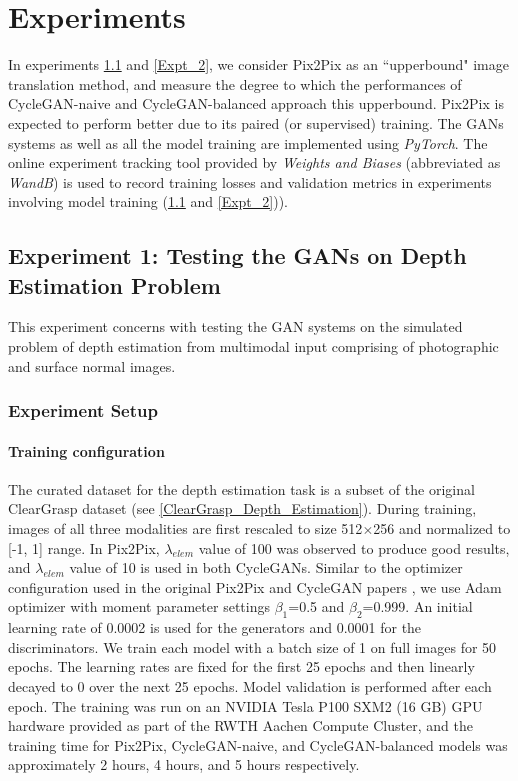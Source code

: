 \chapter{Experiments}
\label{Experiments}
In experiments \ref{Expt_1} and \ref{Expt_2}, we consider Pix2Pix as an ``upperbound" image translation method, and measure the degree to which the performances of CycleGAN-naive and CycleGAN-balanced approach this upperbound. Pix2Pix is expected to perform better due to its paired (or supervised) training. The GANs systems as well as all the model training are implemented using \textit{PyTorch}. The online experiment tracking tool provided by \textit{Weights and Biases} (abbreviated as \textit{WandB}) is used to record training losses and validation metrics in experiments involving model training (\ref{Expt_1} and \ref{Expt_2})).



\section{Experiment 1: Testing the GANs on Depth Estimation Problem}
\label{Expt_1}

This experiment concerns with testing the GAN systems on the simulated problem of depth estimation from multimodal input comprising of photographic and surface normal images.


\subsection{Experiment Setup}

\subsubsection{Training configuration}
The curated dataset for the depth estimation task is a subset of the original ClearGrasp dataset (see \ref{ClearGrasp_Depth_Estimation}). During training, images of all three modalities are first rescaled to size 512$\times$256 and normalized to [-1, 1] range.  In Pix2Pix, $\lambda_{elem}$ value of 100 was observed to produce good results, and $\lambda_{elem}$ value of 10 is used in both CycleGANs. Similar to the optimizer configuration used in the original Pix2Pix and CycleGAN papers \cite{isola2017image, zhu2017unpaired}, we use Adam optimizer with moment parameter settings $\beta_1$=0.5 and $\beta_2$=0.999. An initial learning rate of 0.0002 is used for the generators and 0.0001 for the discriminators. We train each model with a batch size of 1 on full images for 50 epochs. The learning rates are fixed for the first 25 epochs and then linearly decayed to 0 over the next 25 epochs. Model validation is performed after each epoch. The training was run on an NVIDIA Tesla P100 SXM2 (16 GB) GPU hardware provided as part of the RWTH Aachen Compute Cluster, and the training time for Pix2Pix, CycleGAN-naive, and CycleGAN-balanced models was approximately 2 hours, 4 hours, and 5 hours respectively.

